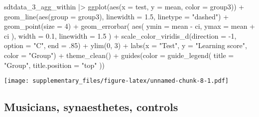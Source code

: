 \documentclass[
  man,floatsintext]{apa7}
\newenvironment{Shaded}{\begin{snugshade}}{\end{snugshade}}
\newcommand{\AttributeTok}[1]{\textcolor[rgb]{0.77,0.63,0.00}{#1}}
\newcommand{\DecValTok}[1]{\textcolor[rgb]{0.00,0.00,0.81}{#1}}
\newcommand{\FloatTok}[1]{\textcolor[rgb]{0.00,0.00,0.81}{#1}}
\newcommand{\FunctionTok}[1]{\textcolor[rgb]{0.00,0.00,0.00}{#1}}
\newcommand{\NormalTok}[1]{#1}
\newcommand{\SpecialCharTok}[1]{\textcolor[rgb]{0.00,0.00,0.00}{#1}}
\newcommand{\StringTok}[1]{\textcolor[rgb]{0.31,0.60,0.02}{#1}}
\begin{document}
\begin{Shaded}
\begin{Highlighting}[]
\NormalTok{sdtdata\_3\_agg\_within }\SpecialCharTok{|\textgreater{}}
  \FunctionTok{ggplot}\NormalTok{(}\FunctionTok{aes}\NormalTok{(}\AttributeTok{x =}\NormalTok{ test, }\AttributeTok{y =}\NormalTok{ mean, }\AttributeTok{color =}\NormalTok{ group3)) }\SpecialCharTok{+}
  \FunctionTok{geom\_line}\NormalTok{(}\FunctionTok{aes}\NormalTok{(}\AttributeTok{group =}\NormalTok{ group3), }\AttributeTok{linewidth =} \FloatTok{1.5}\NormalTok{, }\AttributeTok{linetype =} \StringTok{"dashed"}\NormalTok{) }\SpecialCharTok{+}
  \FunctionTok{geom\_point}\NormalTok{(}\AttributeTok{size =} \DecValTok{4}\NormalTok{) }\SpecialCharTok{+}
  \FunctionTok{geom\_errorbar}\NormalTok{(}
    \FunctionTok{aes}\NormalTok{(}
      \AttributeTok{ymin =}\NormalTok{ mean }\SpecialCharTok{{-}}\NormalTok{ ci,}
      \AttributeTok{ymax =}\NormalTok{ mean }\SpecialCharTok{+}\NormalTok{ ci}
\NormalTok{    ),}
    \AttributeTok{width =} \FloatTok{0.1}\NormalTok{, }\AttributeTok{linewidth =} \FloatTok{1.5}
\NormalTok{  ) }\SpecialCharTok{+}
  \FunctionTok{scale\_color\_viridis\_d}\NormalTok{(}\AttributeTok{direction =} \SpecialCharTok{{-}}\DecValTok{1}\NormalTok{, }\AttributeTok{option =} \StringTok{"C"}\NormalTok{, }\AttributeTok{end =}\NormalTok{ .}\DecValTok{85}\NormalTok{) }\SpecialCharTok{+}
  \FunctionTok{ylim}\NormalTok{(}\DecValTok{0}\NormalTok{, }\DecValTok{3}\NormalTok{) }\SpecialCharTok{+}
  \FunctionTok{labs}\NormalTok{(}\AttributeTok{x =} \StringTok{"Test"}\NormalTok{, }\AttributeTok{y =} \StringTok{"Learning score"}\NormalTok{, }\AttributeTok{color =} \StringTok{"Group"}\NormalTok{) }\SpecialCharTok{+}
  \FunctionTok{theme\_clean}\NormalTok{() }\SpecialCharTok{+}
  \FunctionTok{guides}\NormalTok{(}\AttributeTok{color =} \FunctionTok{guide\_legend}\NormalTok{(}
    \AttributeTok{title =} \StringTok{"Group"}\NormalTok{,}
    \AttributeTok{title.position =} \StringTok{"top"}
\NormalTok{  ))}
\end{Highlighting}
\end{Shaded}

\texttt{[image: supplementary\_files/figure-latex/unnamed-chunk-8-1.pdf]}

\hypertarget{musicians-synaesthetes-controls}{%
\subsection{Musicians, synaesthetes, controls}\label{musicians-synaesthetes-controls}}
\end{document}
